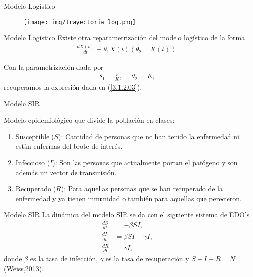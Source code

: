 \documentclass[10pt,aspectratio=169]{beamer}
\begin{document}
\begin{frame}{Modelo Logístico}
  \begin{figure}
    \centering
    \texttt{[image: img/trayectoria\_log.png]}
    \label{fig:trayectoria_logistico}
  \end{figure}
\end{frame}

\begin{frame}{Modelo Logístico}
  Existe otra reparametrización del modelo logístico de la forma
  \begin{align}
    \frac{dX(t)}{dt} = \theta_1 X(t)\left(\theta_2 - X(t)\right).
    \label{3.1.2.06}
  \end{align}

  Con la parametrización dada por
  \begin{align*}
      \theta_1 = \frac{r}{K}, \:\:\:\:\:\: \theta_2 = K,
  \end{align*}
  recuperamos la expresión dada en (\ref{3.1.2.03}).

\end{frame}


\begin{frame}{Modelo SIR}

  Modelo epidemiológico que divide la población en clases:
  \begin{enumerate}
    \item Susceptible ($S$): Cantidad de personas que no han tenido la enfermedad ni están enfermas del brote de interés.
    \item Infeccioso ($I$): Son las personas que actualmente portan el patógeno y son además un vector de transmisión.
    \item Recuperado ($R$): Para aquellas personas que se han recuperado de la enfermedad y ya tienen inmunidad o también para aquellas que perecieron.
  \end{enumerate}
  
\end{frame}


\begin{frame}{Modelo SIR}
  La dinámica del modelo SIR se da con el siguiente sistema de EDO's
  \begin{align}
      \frac{dS}{dt} &= -\beta S I, \nonumber \\
      \frac{dI}{dt} &= \beta S I - \gamma I,
      \label{3.1.3.01} \\
      \frac{dR}{dt} &= \gamma I, \nonumber
  \end{align}
  donde $\beta$ es la tasa de infección, $\gamma$ es la tasa de recuperación y $S + I + R = N$ (Weiss,2013).
\end{frame}
\end{document}
